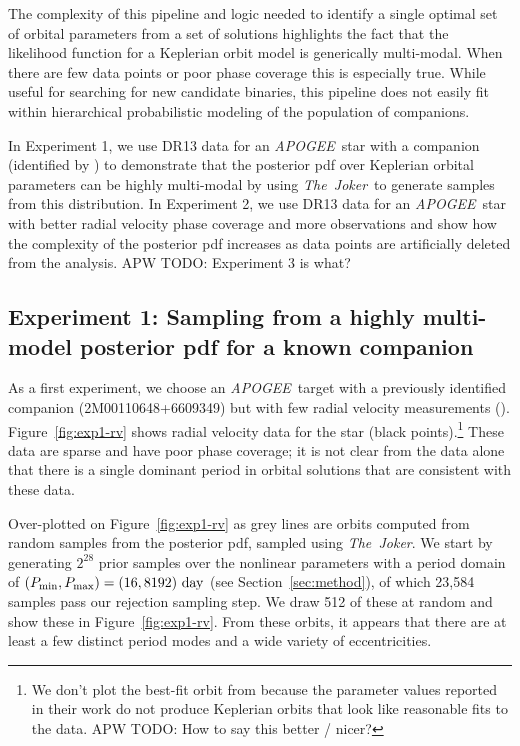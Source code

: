 \documentclass[manuscript, letterpaper]{aastex6}
\newcommand{\project}[1]{\textsl{#1}}
\newcommand{\acronym}[1]{{\small{#1}}}
\newcommand{\apogee}{\project{\acronym{APOGEE}}}
\newcommand{\samplername}{\project{The~Joker}}
\newcommand{\sectionname}{Section}
\newcommand{\figname}{Figure}
\newcommand{\todoapw}[1]{{\color{red}APW TODO: #1}}
\begin{document}
The complexity of this pipeline and logic needed to identify a single optimal
set of orbital parameters from a set of solutions highlights the fact that the
likelihood function for a Keplerian orbit model is generically multi-modal.
When there are few data points or poor phase coverage this is especially true.
While useful for searching for new candidate binaries, this pipeline does not
easily fit within hierarchical probabilistic modeling of the population of
companions.

In Experiment 1, we use DR13 data for an \apogee\ star with a companion
(identified by \citealt{Troup:2016}) to demonstrate that the posterior pdf over
Keplerian orbital parameters can be highly multi-modal by using \samplername\
to generate samples from this distribution.
In Experiment 2, we use DR13 data for an \apogee\ star with better radial
velocity phase coverage and more observations and show how the complexity of
the posterior pdf increases as data points are artificially deleted from the
analysis.
\todoapw{Experiment 3 is what?}

\subsection{Experiment 1: Sampling from a highly multi-model posterior pdf for
a known companion}

As a first experiment, we choose an \apogee\ target with a previously
identified companion (2M00110648+6609349) but with few radial velocity
measurements (\citealt{Troup:2016}).
\figname~\ref{fig:exp1-rv} shows radial velocity data for the star (black
points).\footnote{We don't plot the best-fit orbit from \citealt{Troup:2016}
because the parameter values reported in their work do not produce Keplerian
orbits that look like reasonable fits to the data.
\todoapw{How to say this better / nicer?}}
These data are sparse and have poor phase coverage; it is not clear from the
data alone that there is a single dominant period in orbital solutions that are
consistent with these data.

Over-plotted on \figname~\ref{fig:exp1-rv} as grey lines are orbits computed
from random samples from the posterior pdf, sampled using \samplername.
We start by generating $2^{28}$ prior samples over the nonlinear parameters with
a period domain of $(P_{\rm min}, P_{\rm max}) = (16, 8192)~{\rm day}$ (see
\sectionname~\ref{sec:method}), of which 23,584 samples pass our rejection sampling
step.
We draw 512 of these at random and show these in \figname~\ref{fig:exp1-rv}.
From these orbits, it appears that there are at least a few distinct period
modes and a wide variety of eccentricities.
\end{document}
